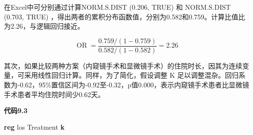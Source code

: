\documentclass[
  chinese-hans,
  letterpaper,
  DIV=11,
  numbers=noendperiod]{scrreprt}
\newenvironment{Shaded}{\begin{snugshade}}{\end{snugshade}}
\newcommand{\KeywordTok}[1]{\textcolor[rgb]{0.00,0.23,0.31}{\textbf{#1}}}
\newcommand{\NormalTok}[1]{\textcolor[rgb]{0.00,0.23,0.31}{#1}}
\begin{document}
在Excel中可分别通过计算NORM.S.DIST (0.206, TRUE) 和 NORM.S.DIST (0.703,
TRUE)
，得出两者的累积分布函数值，分别为0.582和0.759。计算比值比为2.26，与逻辑回归接近。

\[\operatorname{OR}=\frac{0.759/(1-0.759)}{0.582/(1-0.582)}=2.26\]

其次，如果比较两种方案（内窥镜手术和显微镜手术）的住院时长，因其为连续变量，可采用线性回归计算。同样，为了简化，假设调整
K
足以调整混杂。回归系数为-0.62，95\%置信区间为-0.92至-0.32，p值0.000，表示内窥镜手术患者比显微镜手术患者平均住院时间少0.62天。

\begin{tcolorbox}[enhanced jigsaw, arc=.35mm, bottomrule=.15mm, breakable, colback=white, colframe=quarto-callout-note-color-frame, left=2mm, leftrule=.75mm, opacityback=0, rightrule=.15mm, toprule=.15mm]

\vspace{-3mm}\textbf{代码9.3}\vspace{3mm}

\begin{Shaded}
\begin{Highlighting}[]
\KeywordTok{reg}\NormalTok{ los Treatment }\KeywordTok{k}
\end{Highlighting}
\end{Shaded}

\end{tcolorbox}
\end{document}
